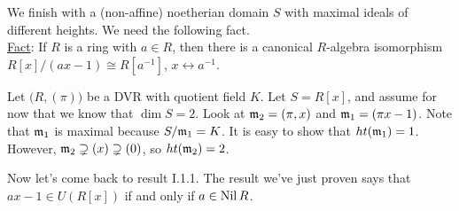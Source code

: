  We finish with a (non-affine) noetherian domain $S$ with maximal ideals of different
 heights. We need the following fact.\\
 \underline{Fact}: If $R$ is a ring with $a\in R$, then there is a canonical $R$-algebra
 isomorphism $R[x]/(ax-1) \cong R[a^{-1}]$, $x\leftrightarrow a^{-1}$.
 \begin{example}
   Let $\bigl(R,(\pi)\bigr)$ be a DVR with quotient field $K$. Let $S=R[x]$, and assume
   for now that we know that $\dim S=2$. Look at $\mathfrak{m}_2=(\pi,x)$ and $\mathfrak{m}_1=(\pi x-1)$.
   Note that $\mathfrak{m}_1$ is maximal because $S/\mathfrak{m}_1 = K$. It is easy to show that
   $ht(\mathfrak{m}_1)=1$. However, $\mathfrak{m}_2\supsetneq (x)\supsetneq (0)$, so $ht(\mathfrak{m}_2)=2$.
 \end{example}
 Now let's come back to result I.1.1. The result we've just proven says that $ax-1\in
 U(R[x])$ if and only if $a\in \operatorname{Nil} R$.
